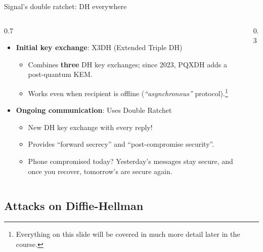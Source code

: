 \ifdefined\PRESENTATION\else\PassOptionsToClass{handout}{beamer}\fi\documentclass[aspectratio=169, lualatex]{beamer}
\begin{document}
\begin{frame}{Signal's double ratchet: DH everywhere}
	\begin{columns}[c]
		\begin{column}{0.7\textwidth}
			\begin{itemize}[<+->]
				\item \textbf{Initial key exchange}: X3DH (Extended Triple DH)
				      \begin{itemize}
					      \item Combines \textbf{three} DH key exchanges; since 2023, PQXDH adds a post-quantum KEM.
					      \item Works even when recipient is offline (\textit{``asynchronous''} protocol).\footnote{Everything on this slide will be covered in much more detail later in the course.}
				      \end{itemize}
				\item \textbf{Ongoing communication}: Uses Double Ratchet
				      \begin{itemize}
					      \item New DH key exchange with every reply!
					      \item Provides ``forward secrecy'' and ``post-compromise security''.
					      \item Phone compromised today? Yesterday's messages stay secure, and once you recover, tomorrow's are secure again.
				      \end{itemize}
			\end{itemize}
		\end{column}
		\begin{column}{0.3\textwidth}
		\end{column}
	\end{columns}
\end{frame}

\subsection{Attacks on Diffie-Hellman}
\end{document}

